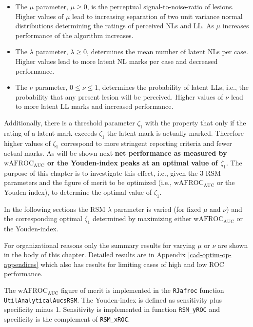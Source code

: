 \documentclass[
]{book}
\begin{document}
\begin{itemize}
\item
  The \(\mu\) parameter, \(\mu \ge 0\), is the perceptual signal-to-noise-ratio of lesions. Higher values of \(\mu\) lead to increasing separation of two unit variance normal distributions determining the ratings of perceived NLs and LL. As \(\mu\) increases performance of the algorithm increases.
\item
  The \(\lambda\) parameter, \(\lambda \ge 0\), determines the mean number of latent NLs per case. Higher values lead to more latent NL marks per case and decreased performance.
\item
  The \(\nu\) parameter, \(0 \le \nu \le 1\), determines the probability of latent LLs, i.e., the probability that any present lesion will be perceived. Higher values of \(\nu\) lead to more latent LL marks and increased performance.
\end{itemize}

Additionally, there is a threshold parameter \(\zeta_1\) with the property that only if the rating of a latent mark exceeds \(\zeta_1\) the latent mark is actually marked. Therefore higher values of \(\zeta_1\) correspond to more stringent reporting criteria and fewer actual marks. As will be shown next \textbf{net performance as measured by \(\text{wAFROC}_\text{AUC}\) or the Youden-index peaks at an optimal value of \(\zeta_1\)}. The purpose of this chapter is to investigate this effect, i.e., given the 3 RSM parameters and the figure of merit to be optimized (i.e., \(\text{wAFROC}_\text{AUC}\) or the Youden-index), to determine the optimal value of \(\zeta_1\).

In the following sections the RSM \(\lambda\) parameter is varied (for fixed \(\mu\) and \(\nu\)) and the corresponding optimal \(\zeta_1\) determined by maximizing either \(\text{wAFROC}_\text{AUC}\) or the Youden-index.

For organizational reasons only the summary results for varying \(\mu\) or \(\nu\) are shown in the body of this chapter. Detailed results are in Appendix \ref{cad-optim-op-appendices} which also has results for limiting cases of high and low ROC performance.

The \(\text{wAFROC}_\text{AUC}\) figure of merit is implemented in the \texttt{RJafroc} function \texttt{UtilAnalyticalAucsRSM}. The Youden-index is defined as sensitivity plus specificity minus 1. Sensitivity is implemented in function \texttt{RSM\_yROC} and specificity is the complement of \texttt{RSM\_xROC}.
\end{document}

